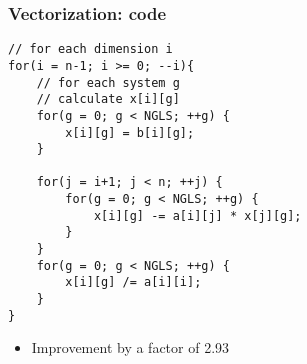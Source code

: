 \begin{frame}[fragile]
\frametitle{Vectorization: code}

\codestylec
\begin{lstlisting}
// for each dimension i
for(i = n-1; i >= 0; --i){
    // for each system g
    // calculate x[i][g]
    for(g = 0; g < NGLS; ++g) {
        x[i][g] = b[i][g];
    }

    for(j = i+1; j < n; ++j) {
        for(g = 0; g < NGLS; ++g) {
	        x[i][g] -= a[i][j] * x[j][g];
        }
    }
    for(g = 0; g < NGLS; ++g) {
        x[i][g] /= a[i][i];
    }
}
\end{lstlisting}

\begin{itemize}
\item Improvement by a factor of 2.93
\end{itemize}
\end{frame}
